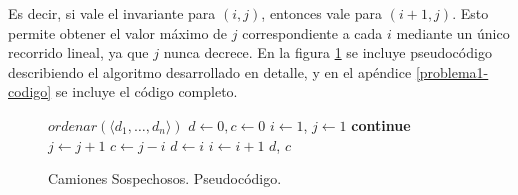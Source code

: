 Es decir, si vale el invariante para $(i,j)$, entonces vale para $(i+1,j)$. Esto permite obtener el valor máximo de $j$ correspondiente a cada $i$ mediante un único recorrido lineal, ya que $j$ nunca decrece. En la figura \ref{problema1-pseudo} se incluye pseudocódigo describiendo el algoritmo desarrollado en detalle, y en el apéndice \ref{problema1-codigo} se incluye el código completo.

\begin{center}
\begin{figure}[H]
    \begin{pseudo}
            \State $ordenar(\langle d_1, \ldots, d_n \rangle)$ 
            \State $d \leftarrow 0, c \leftarrow 0$ 
            \State $i \leftarrow 1$, $j \leftarrow 1$ 
             
                    \textbf{continue} 
                \EndIf
                 
                    \State $j \leftarrow j + 1$ 
                \EndWhile
                 
                    \State $c \leftarrow j - i$ 
                    \State $d \leftarrow i$ 
                \EndIf
                \State $i \leftarrow i + 1$ 
            \EndWhile
            \Return $d$, $c$
        \EndProcedure
    \end{pseudo}
    \caption{Camiones Sospechosos. Pseudocódigo.}
    \label{problema1-pseudo}
\end{figure}
\end{center}
